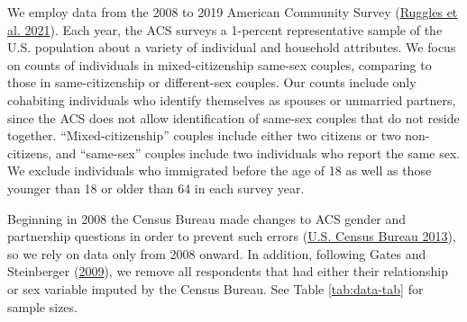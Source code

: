 \documentclass[
  12pt,
]{article}
\begin{document}
We employ data from the 2008 to 2019 American Community Survey (\protect\hyperlink{ref-ruggles_2021}{Ruggles et al. 2021}). Each year, the ACS surveys a 1-percent representative sample of the U.S. population about a variety of individual and household attributes. We focus on counts of individuals in mixed-citizenship same-sex couples, comparing to those in same-citizenship or different-sex couples. Our counts include only cohabiting individuals who identify themselves as spouses or unmarried partners, since the ACS does not allow identification of same-sex couples that do not reside together. ``Mixed-citizenship'' couples include either two citizens or two non-citizens, and ``same-sex'' couples include two individuals who report the same sex. We exclude individuals who immigrated before the age of 18 as well as those younger than 18 or older than 64 in each survey year.

Beginning in 2008 the Census Bureau made changes to ACS gender and partnership questions in order to prevent such errors (\protect\hyperlink{ref-u.s.censusbureau_2013}{U.S. Census Bureau 2013}), so we rely on data only from 2008 onward. In addition, following Gates and Steinberger (\protect\hyperlink{ref-gates_2009}{2009}), we remove all respondents that had either their relationship or sex variable imputed by the Census Bureau. See Table \ref{tab:data-tab} for sample sizes.

\providecommand{\docline}[3]{\noalign{\global\setlength{\arrayrulewidth}{#1}}\arrayrulecolor[HTML]{#2}\cline{#3}}

\setlength{\tabcolsep}{2pt}

\renewcommand*{\arraystretch}{1.5}
\end{document}
